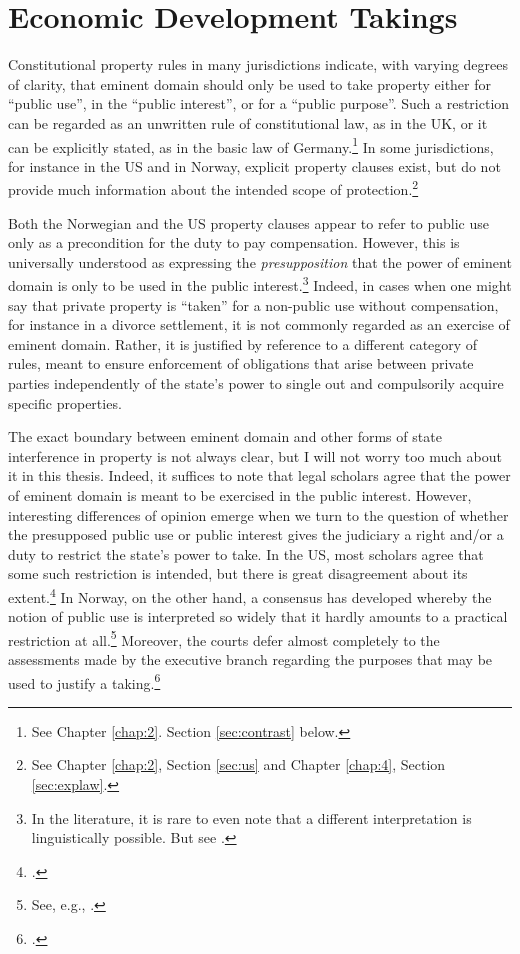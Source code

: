 \section{Economic Development Takings}\label{sec:edt}

Constitutional property rules in many jurisdictions indicate, with varying degrees of clarity, that eminent domain should only be used to take property either for ``public use'', in the ``public interest'', or for a ``public purpose''. Such a restriction can be regarded as an unwritten rule of constitutional law, as in the UK, or it can be explicitly stated, as in the basic law of Germany.\footnote{See Chapter \ref{chap:2}. Section \ref{sec:contrast} below.} In some jurisdictions, for instance in the US and in Norway, explicit property clauses exist, but do not provide much information about the intended scope of protection.\footnote{See Chapter \ref{chap:2}, Section \ref{sec:us} and Chapter \ref{chap:4}, Section \ref{sec:explaw}.}

Both the Norwegian and the US property clauses appear to refer to public use only as a precondition for the duty to pay compensation. However, this is universally understood as expressing the {\it presupposition} that the power of eminent domain is only to be used in the public interest.\footnote{In the literature, it is rare to even note that a different interpretation is linguistically possible. But see \cite[205]{berger78}.} Indeed, in cases when one might say that private property is ``taken'' for a non-public use without compensation, for instance in a divorce settlement, it is not commonly regarded as an exercise of eminent domain. Rather, it is justified by reference to a different category of rules, meant to ensure enforcement of obligations that arise between private parties independently of the state's power to single out and compulsorily acquire specific properties.

The exact boundary between eminent domain and other forms of state interference in property is not always clear, but I will not worry too much about it in this thesis. Indeed, it suffices to note that legal scholars agree that the power of eminent domain is meant to be exercised in the public interest. However, interesting differences of opinion emerge when we turn to the question of whether the presupposed public use or public interest gives the judiciary a right and/or a duty to restrict the state's power to take. In the US, most scholars agree that some such restriction is intended, but there is great disagreement about its extent.\footcite[205]{berger78} In Norway, on the other hand, a consensus has developed whereby the notion of public use is interpreted so widely that it hardly amounts to a practical restriction at all.\footnote{See, e.g., \cite[368]{aall10}.} Moreover, the courts defer almost completely to the assessments made by the executive branch regarding the purposes that may be used to justify a taking.\footcite[368]{aall10}


